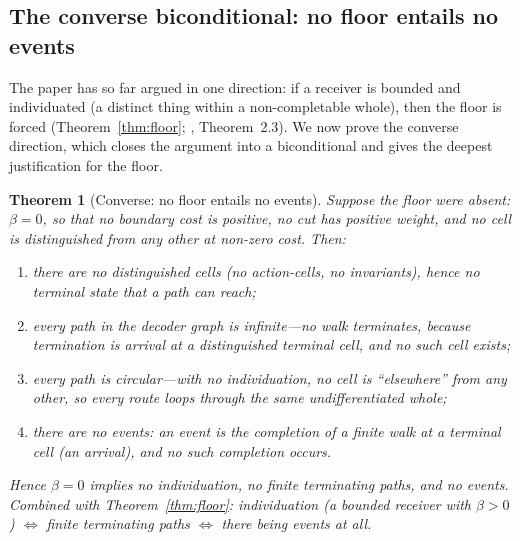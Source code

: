 \documentclass[twocolumn,11pt,a4paper]{article}
\theoremstyle{adv}
\newtheorem{theorem}{Theorem}[section]
\theoremstyle{definition}
\theoremstyle{remark}
\newcommand{\floor}{\beta}            %
\begin{document}
\subsection{The converse biconditional: no floor entails no events}

The paper has so far argued in one direction: if a receiver is bounded and
individuated (a distinct thing within a non-completable whole), then the floor
is forced (Theorem~\ref{thm:floor}; \citealt{sachikonye2025contact},
Theorem~2.3). We now prove the converse direction, which closes the argument
into a biconditional and gives the deepest justification for the floor.

\begin{theorem}[Converse: no floor entails no events]
\label{thm:converse-floor}
Suppose the floor were absent: $\floor=0$, so that no boundary cost is
positive, no cut has positive weight, and no cell is distinguished from any
other at non-zero cost. Then:
\begin{enumerate}[label=\textup{(\roman*)},leftmargin=2.2em]
\item there are no distinguished cells (no action-cells, no invariants), hence
      no terminal state that a path can reach;
\item every path in the decoder graph is infinite---no walk terminates,
      because termination is arrival at a distinguished terminal cell, and no
      such cell exists;
\item every path is circular---with no individuation, no cell is ``elsewhere''
      from any other, so every route loops through the same undifferentiated
      whole;
\item there are no events: an event is the completion of a finite walk at a
      terminal cell (an arrival), and no such completion occurs.
\end{enumerate}
Hence $\floor=0$ implies no individuation, no finite terminating paths, and
no events. Combined with Theorem~\ref{thm:floor}: \emph{individuation} (a
bounded receiver with $\floor>0$) \emph{$\iff$ finite terminating paths
$\iff$ there being events at all}.
\end{theorem}
\end{document}
